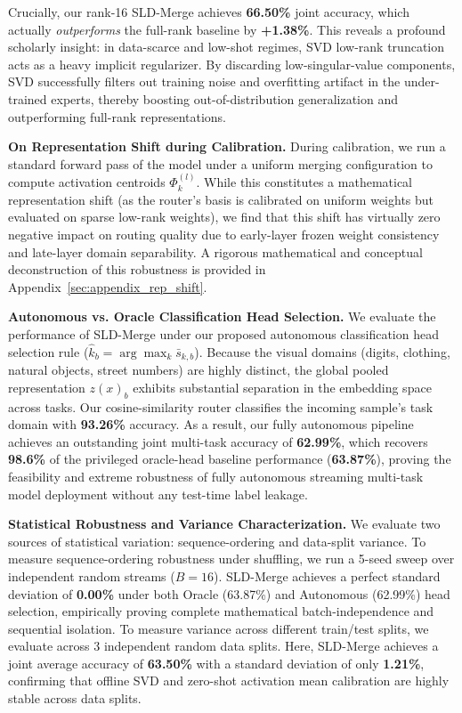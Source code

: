 Crucially, our rank-16 SLD-Merge achieves \textbf{66.50\%} joint accuracy, which actually \emph{outperforms} the full-rank baseline by \textbf{+1.38\%}. This reveals a profound scholarly insight: in data-scarce and low-shot regimes, SVD low-rank truncation acts as a heavy implicit regularizer. By discarding low-singular-value components, SVD successfully filters out training noise and overfitting artifact in the under-trained experts, thereby boosting out-of-distribution generalization and outperforming full-rank representations.

\textbf{On Representation Shift during Calibration.}
During calibration, we run a standard forward pass of the model under a uniform merging configuration to compute activation centroids $\Phi_k^{(l)}$. While this constitutes a mathematical representation shift (as the router's basis is calibrated on uniform weights but evaluated on sparse low-rank weights), we find that this shift has virtually zero negative impact on routing quality due to early-layer frozen weight consistency and late-layer domain separability. A rigorous mathematical and conceptual deconstruction of this robustness is provided in Appendix~\ref{sec:appendix_rep_shift}.

\textbf{Autonomous vs. Oracle Classification Head Selection.}
We evaluate the performance of SLD-Merge under our proposed autonomous classification head selection rule ($\hat{k}_b = \arg\max_k \bar{s}_{k,b}$). Because the visual domains (digits, clothing, natural objects, street numbers) are highly distinct, the global pooled representation $z(x)_b$ exhibits substantial separation in the embedding space across tasks. Our cosine-similarity router classifies the incoming sample's task domain with \textbf{93.26\%} accuracy. As a result, our fully autonomous pipeline achieves an outstanding joint multi-task accuracy of \textbf{62.99\%}, which recovers \textbf{98.6\%} of the privileged oracle-head baseline performance (\textbf{63.87\%}), proving the feasibility and extreme robustness of fully autonomous streaming multi-task model deployment without any test-time label leakage.

\textbf{Statistical Robustness and Variance Characterization.}
We evaluate two sources of statistical variation: sequence-ordering and data-split variance. To measure sequence-ordering robustness under shuffling, we run a 5-seed sweep over independent random streams ($B=16$). SLD-Merge achieves a perfect standard deviation of \textbf{0.00\%} under both Oracle (63.87\%) and Autonomous (62.99\%) head selection, empirically proving complete mathematical batch-independence and sequential isolation. To measure variance across different train/test splits, we evaluate across 3 independent random data splits. Here, SLD-Merge achieves a joint average accuracy of \textbf{63.50\%} with a standard deviation of only \textbf{1.21\%}, confirming that offline SVD and zero-shot activation mean calibration are highly stable across data splits.

